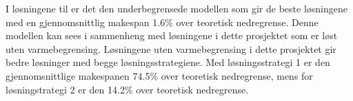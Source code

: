 I løsningene til \bht er det den underbegrensede modellen som gir de beste løsningene med en gjennomsnittlig makespan 1.6\% over teoretisk nedregrense. Denne modellen kan sees i sammenheng med løsningene i dette prosjektet som er løst uten varmebegrensing. Løsningene uten varmebegrensing i dette prosjektet gir bedre løsninger med begge løsningsstrategiene. Med løsningsstrategi 1 er den gjennomsnittlige makespanen 74.5\% over teoretisk nedregrense, mens for løsningstrategi 2 er den 14.2\% over teoretisk nedregrense.